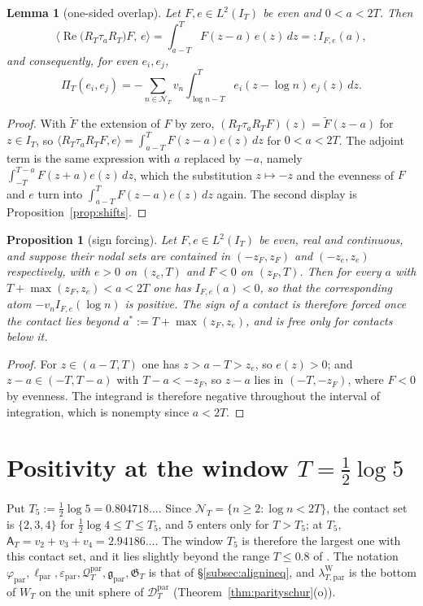 \documentclass[11pt]{amsart}
\newtheorem{proposition}[theorem]{Proposition}
\newtheorem{lemma}[theorem]{Lemma}
\theoremstyle{definition}
\theoremstyle{remark}
\newcommand{\Rel}{\operatorname{Re}}
\newcommand{\IT}{I_T}
\newcommand{\NT}{\mathcal N_T}
\newcommand{\Aconst}{\mathsf A_T}
\newcommand{\PiT}{\Pi_T}
\begin{document}
\begin{lemma}[one-sided overlap]\label{lem:N}
Let $F,e\in L^2(\IT)$ be even and $0<a<2T$. Then
\[
\big\langle\Rel\big(R_T\tau_aR_T\big)F,\,e\big\rangle=\int_{a-T}^{T}F(z-a)\,e(z)\,dz=:I_{F,e}(a),
\]
and consequently, for even $e_i,e_j$,
\[
\PiT(e_i,e_j)=-\sum_{n\in\NT}v_n\int_{\log n-T}^{T}e_i(z-\log n)\,e_j(z)\,dz .
\]
\end{lemma}
\begin{proof}
With $\widetilde F$ the extension of $F$ by zero, $(R_T\tau_aR_TF)(z)=\widetilde F(z-a)$ for
$z\in\IT$, so $\langle R_T\tau_aR_TF,e\rangle=\int_{a-T}^{T}F(z-a)e(z)\,dz$ for $0<a<2T$. The
adjoint term is the same expression with $a$ replaced by $-a$, namely
$\int_{-T}^{T-a}F(z+a)e(z)\,dz$, which the substitution $z\mapsto-z$ and the evenness of $F$ and $e$
turn into $\int_{a-T}^{T}F(z-a)e(z)\,dz$ again. The second display is
Proposition~\ref{prop:shifts}.
\end{proof}

\begin{proposition}[sign forcing]\label{prop:G}
Let $F,e\in L^2(\IT)$ be even, real and continuous, and suppose their nodal sets are contained in
$(-z_F,z_F)$ and $(-z_e,z_e)$ respectively, with $e>0$ on $(z_e,T)$ and $F<0$ on $(z_F,T)$. Then for
every $a$ with $T+\max(z_F,z_e)<a<2T$ one has $I_{F,e}(a)<0$, so that the corresponding atom
$-v_nI_{F,e}(\log n)$ is positive. The sign of a contact is therefore forced once the contact lies
beyond $a^*:=T+\max(z_F,z_e)$, and is free only for contacts below it.
\end{proposition}
\begin{proof}
For $z\in(a-T,T)$ one has $z>a-T>z_e$, so $e(z)>0$; and $z-a\in(-T,T-a)$ with $T-a<-z_F$, so
$z-a$ lies in $(-T,-z_F)$, where $F<0$ by evenness. The integrand is therefore negative throughout
the interval of integration, which is nonempty since $a<2T$.
\end{proof}


\section{Positivity at the window \texorpdfstring{$T=\tfrac12\log5$}{T = (1/2) log 5}}\label{sec:log5}

Put $T_5:=\frac12\log5=0.804718\ldots$. Since $\NT=\{n\ge2:\log n<2T\}$, the contact set is
$\{2,3,4\}$ for $\frac12\log4\le T\le T_5$, and $5$ enters only for $T>T_5$; at $T_5$,
$\Aconst=v_2+v_3+v_4=2.94186\ldots$. The window $T_5$ is therefore the largest one with this contact set,
and it lies slightly beyond the range $T\le0.8$ of \cite[Thm.~1.2]{Zhu2026}. The notation
$\varphi_{\mathrm{par}},\ell_{\mathrm{par}},\varepsilon_{\mathrm{par}},\mathcal Q^{\mathrm{par}}_T,
\mathfrak g_{\mathrm{par}},\mathfrak G_T$ is that of \S\ref{subsec:alignineq}, and
$\lambda^{\mathrm W}_{T,\mathrm{par}}$ is the bottom of $W_T$ on the unit sphere of
$\mathcal D^{\mathrm{par}}_T$ (Theorem~\ref{thm:parityschur}(o)).
\end{document}
